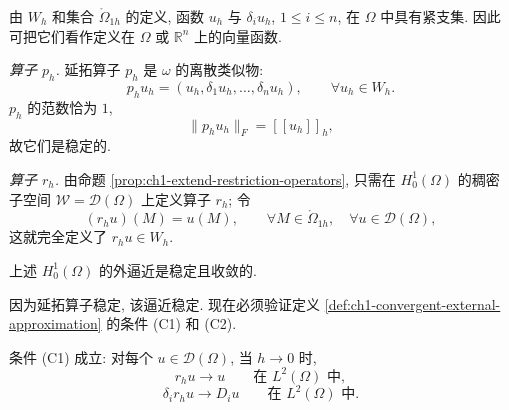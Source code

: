 由 $W_h$ 和集合 $\mathring\Omega_{1h}$ 的定义, 函数 $u_h$ 与 $\delta_iu_h$, $1\leq i\leq n$, 在 $\Omega$ 中具有紧支集. 因此可把它们看作定义在 $\Omega$ 或 $\mathbb R^n$ 上的向量函数.

\emph{算子 $p_h$.} 延拓算子 $p_h$ 是 $\omega$ 的离散类似物:
\begin{equation}
p_hu_h=(u_h,\delta_1u_h,\ldots,\delta_nu_h),
\qquad\forall u_h\in W_h.
\label{eq:ch1-h01-prolongation}
\end{equation}
$p_h$ 的范数恰为 $1$,
\[
\|p_hu_h\|_F=[[u_h]]_h,
\]
故它们是稳定的.

\emph{算子 $r_h$.} 由命题 \ref{prop:ch1-extend-restriction-operators}, 只需在 $H_0^1(\Omega)$ 的稠密子空间 $\mathcal W=\mathcal D(\Omega)$ 上定义算子 $r_h$; 令
\begin{equation}
(r_hu)(M)=u(M),\qquad
\forall M\in\mathring\Omega_{1h},\quad\forall u\in\mathcal D(\Omega),
\label{eq:ch1-h01-restriction}
\end{equation}
这就完全定义了 $r_hu\in W_h$.

\begin{Proposition}
\label{prop:ch1-h01-external-approximation}
上述 $H_0^1(\Omega)$ 的外逼近是稳定且收敛的.
\end{Proposition}

\begin{Proof}
因为延拓算子稳定, 该逼近稳定. 现在必须验证定义 \ref{def:ch1-convergent-external-approximation} 的条件 (C1) 和 (C2).
\end{Proof}

\begin{Lemma}
\label{lem:ch1-h01-condition-c1}
条件 (C1) 成立: 对每个 $u\in\mathcal D(\Omega)$, 当 $h\to0$ 时,
\begin{equation}
r_hu\to u\qquad\text{在 }L^2(\Omega)\text{ 中},
\label{eq:ch1-restriction-l2-convergence}
\end{equation}
\begin{equation}
\delta_ir_hu\to D_iu\qquad\text{在 }L^2(\Omega)\text{ 中}.
\label{eq:ch1-difference-derivative-convergence}
\end{equation}
\end{Lemma}

